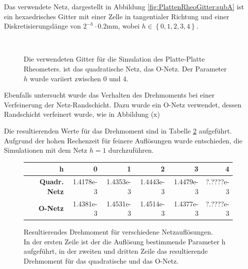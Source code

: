 Das verwendete Netz, dargestellt in Abbildung \ref{fig:PlattenRheoGitter:subA} ist ein hexaedrisches Gitter mit einer Zelle in tangentialer Richtung und einer Diskretisierungslänge von $2^{-h} \cdot 0.2\mbox{mm}$, wobei $h\in\left\{ 0,1,2,3,4 \right\}$.
%
\begin{figure}
    \centering
    \\
    \caption{Die verwendeten Gitter für die Simulation des Platte-Platte Rheometers.  ist das quadratische Netz,  das O-Netz.
    Der Parameter $h$ wurde variiert zwischen 0 und 4.}
    \label{fig:PlattenRheoGitter}
\end{figure}
%

Ebenfalls untersucht wurde das Verhalten des Drehmoments bei einer Verfeinerung der Netz-Randschicht. Dazu wurde ein O-Netz verwendet, dessen Randschicht verfeinert wurde, wie in Abbildung (x)

Die resultierenden Werte für das Drehmoment sind in Tabelle \ref{fig:ResultingTorque} aufgeführt. Aufgrund der hohen Rechenzeit für feinere Auflösungen wurde entschieden, die Simulationen mit dem Netz $h=1$ durchzuführen.
%
\begin{figure}
    \centering
    \begin{tabular}{r r r r r r}
        \textbf{h} \vline & 0 & 1 & 2 & 3 & 4\\
        \hline
        \textbf{Quadr. Netz} \vline & 1.4178e-3 & 1.4353e-3 & 1.4443e-3 & 1.4479e-3 & ?.????e-3\\
        \textbf{O-Netz} \vline & 1.4381e-3 & 1.4531e-3 & 1.4514e-3 & 1.4377e-3 & ?.????e-3
    \end{tabular}
    \caption{Resultierendes Drehmoment für verschiedene Netzauflösungen.\\
    In der ersten Zeile ist der die Auflösung bestimmende Parameter h aufgeführt, in der zweiten und dritten Zeile das resultierende Drehmoment für das quadratische und das O-Netz.}
    \label{fig:ResultingTorque}
\end{figure}
%
